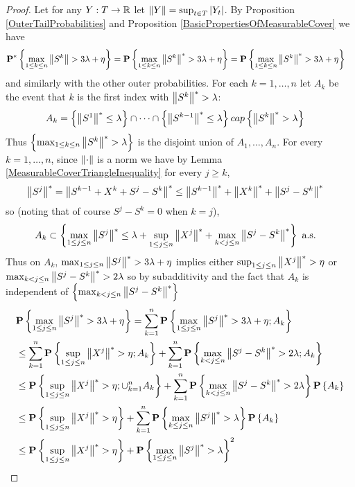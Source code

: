 \begin{proof}
Let for any $Y : T \to \mathbb{R}$ let $\left \lVert Y \right \rVert = \sup_{t \in T} \left \vert Y_t \right \vert$.  
By Proposition \ref{OuterTailProbabilities} and Proposition \ref{BasicPropertiesOfMeasurableCover} we have
\begin{align*}
\textbf{P}^* \left \{\max_{1 \leq k \leq n} \left \lVert S^k \right \rVert > 3\lambda + \eta \right \} 
&= \textbf{P}\left \{\max_{1 \leq k \leq n} \left \lVert S^k \right \rVert^* > 3\lambda + \eta \right \} 
= \textbf{P}\left \{\max_{1 \leq k \leq n} \left \lVert S^k \right \rVert^* > 3\lambda + \eta \right \} 
\end{align*}
and similarly with the other outer probabilities.  For each $k=1, \dotsc, n$ let $A_k$ be the event that $k$ is the first index with $\left \lVert S^{k} \right \rVert^* > \lambda$:
\begin{align*}
A_k &= \left \lbrace \left \lVert S^1 \right \rVert^* \leq \lambda \right \rbrace \cap \dotsb \cap  
\left \lbrace \left \lVert S^{k-1} \right \rVert^* \leq \lambda \right \rbrace 
cap \left \lbrace \left \lVert S^{k} \right \rVert^* > \lambda \right \rbrace 
\end{align*}
Thus $\left \lbrace \max_{1 \leq k \leq n} \left \lVert S^k \right \rVert^* > \lambda\right \rbrace$ is the disjoint union of $A_1, \dotsc, A_n$.  For every $k=1, \dotsc, n$, since $\left \lVert \cdot \right \rVert$ is a norm we have by Lemma \ref{MeasurableCoverTriangleInequality} for every $j \geq k$,
\begin{align*}
\left \lVert S^j \right \rVert^* &= \left \lVert S^{k-1} + X^k + S^j - S^k \right \rVert^* 
\leq \left \lVert S^{k-1} \right \rVert^* + \left \lVert X^k \right \rVert^* + \left \lVert S^j - S^k \right \rVert^*
\end{align*}
so (noting that of course $S^j-S^k=0$ when $k=j$),
\begin{align*}
A_k &\subset \left \lbrace \max_{1 \leq j \leq n} \left \lVert S^j \right \rVert^* \leq \lambda + \sup_{1 \leq j \leq n} \left \lVert X^j \right \rVert^* + \max_{k < j \leq n} \left \lVert S^j - S^k \right \rVert^*  \right \rbrace \text{ a.s.}
\end{align*}
Thus on $A_k$, $\max_{1 \leq j \leq n} \left \lVert S^j \right \rVert^* > 3\lambda + \eta$ implies either $\sup_{1 \leq j \leq n} \left \lVert X^j \right \rVert^* > \eta$ or $\max_{k < j \leq n} \left \lVert S^j - S^k \right \rVert^* > 2\lambda$ so by subadditivity and the fact that $A_k$ is independent of $\left \lbrace \max_{k < j \leq n} \left \lVert S^j - S^k \right \rVert^* \right \rbrace$
\begin{align*}
&\textbf{P}\left \{\max_{1 \leq j \leq n} \left \lVert S^j \right \rVert^* > 3\lambda + \eta \right \} 
= \sum_{k=1}^n \textbf{P}\left \{\max_{1 \leq j \leq n} \left \lVert S^j \right \rVert^* > 3\lambda + \eta ; A_k \right \} \\
&\leq \sum_{k=1}^n \textbf{P}\left \{\sup_{1 \leq j \leq n} \left \lVert X^j \right \rVert^* > \eta ; A_k \right \} + \sum_{k=1}^n \textbf{P}\left \{\max_{k < j \leq n} \left \lVert S^j - S^k \right \rVert^* > 2\lambda ; A_k \right \} \\
&\leq \textbf{P}\left \{\sup_{1 \leq j \leq n} \left \lVert X^j \right \rVert^* > \eta ; \cup_{k=1}^n A_k \right \} + \sum_{k=1}^n \textbf{P}\left \{\max_{k < j \leq n} \left \lVert S^j - S^k \right \rVert^* > 2\lambda \right \} \textbf{P}\left \{A_k \right \} \\
&\leq \textbf{P}\left \{\sup_{1 \leq j \leq n} \left \lVert X^j \right \rVert^* > \eta \right \} + \sum_{k=1}^n \textbf{P}\left \{\max_{k \leq  j \leq n} \left \lVert S^j \right \rVert^* > \lambda \right \} \textbf{P}\left \{A_k \right \} \\
&\leq \textbf{P}\left \{\sup_{1 \leq j \leq n} \left \lVert X^j \right \rVert^* > \eta \right \} + \textbf{P}\left \{\max_{1 \leq  j \leq n} \left \lVert S^j \right \rVert^* > \lambda \right \}^2\\
\end{align*}
\end{proof}

